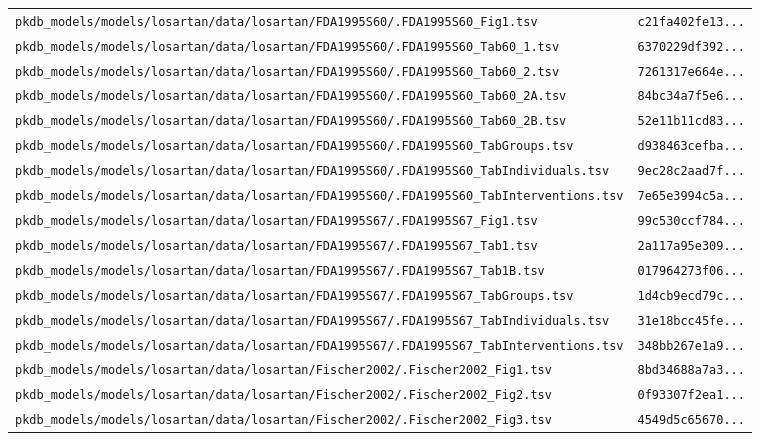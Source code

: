 \begin{longtable}{ll}
\texttt{pkdb\_models/models/losartan/data/losartan/FDA1995S60/.FDA1995S60\_Fig1.tsv} & \texttt{c21fa402fe13...} \\
\texttt{pkdb\_models/models/losartan/data/losartan/FDA1995S60/.FDA1995S60\_Tab60\_1.tsv} & \texttt{6370229df392...} \\
\texttt{pkdb\_models/models/losartan/data/losartan/FDA1995S60/.FDA1995S60\_Tab60\_2.tsv} & \texttt{7261317e664e...} \\
\texttt{pkdb\_models/models/losartan/data/losartan/FDA1995S60/.FDA1995S60\_Tab60\_2A.tsv} & \texttt{84bc34a7f5e6...} \\
\texttt{pkdb\_models/models/losartan/data/losartan/FDA1995S60/.FDA1995S60\_Tab60\_2B.tsv} & \texttt{52e11b11cd83...} \\
\texttt{pkdb\_models/models/losartan/data/losartan/FDA1995S60/.FDA1995S60\_TabGroups.tsv} & \texttt{d938463cefba...} \\
\texttt{pkdb\_models/models/losartan/data/losartan/FDA1995S60/.FDA1995S60\_TabIndividuals.tsv} & \texttt{9ec28c2aad7f...} \\
\texttt{pkdb\_models/models/losartan/data/losartan/FDA1995S60/.FDA1995S60\_TabInterventions.tsv} & \texttt{7e65e3994c5a...} \\
\texttt{pkdb\_models/models/losartan/data/losartan/FDA1995S67/.FDA1995S67\_Fig1.tsv} & \texttt{99c530ccf784...} \\
\texttt{pkdb\_models/models/losartan/data/losartan/FDA1995S67/.FDA1995S67\_Tab1.tsv} & \texttt{2a117a95e309...} \\
\texttt{pkdb\_models/models/losartan/data/losartan/FDA1995S67/.FDA1995S67\_Tab1B.tsv} & \texttt{017964273f06...} \\
\texttt{pkdb\_models/models/losartan/data/losartan/FDA1995S67/.FDA1995S67\_TabGroups.tsv} & \texttt{1d4cb9ecd79c...} \\
\texttt{pkdb\_models/models/losartan/data/losartan/FDA1995S67/.FDA1995S67\_TabIndividuals.tsv} & \texttt{31e18bcc45fe...} \\
\texttt{pkdb\_models/models/losartan/data/losartan/FDA1995S67/.FDA1995S67\_TabInterventions.tsv} & \texttt{348bb267e1a9...} \\
\texttt{pkdb\_models/models/losartan/data/losartan/Fischer2002/.Fischer2002\_Fig1.tsv} & \texttt{8bd34688a7a3...} \\
\texttt{pkdb\_models/models/losartan/data/losartan/Fischer2002/.Fischer2002\_Fig2.tsv} & \texttt{0f93307f2ea1...} \\
\texttt{pkdb\_models/models/losartan/data/losartan/Fischer2002/.Fischer2002\_Fig3.tsv} & \texttt{4549d5c65670...} \\

\end{longtable}
